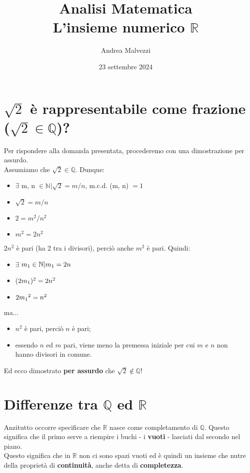 \documentclass[12pt]{article}
\title{\textbf{Analisi Matematica\\L'insieme numerico $\mathbb{R}$}}
\date{23 settembre 2024}
\author{Andrea Malvezzi}
\begin{document}
\maketitle
\pagebreak
\section{$\sqrt{2}$ è rappresentabile come frazione\\($\sqrt{2} \in \mathbb{Q}$)?}
Per rispondere alla domanda presentata, procederemo con una dimostrazione per assurdo.\\
Assumiamo che $\sqrt{2} \in \mathbb{Q}$. Dunque:
\begin{itemize}
    \item $\exists$ m, n $\in \mathbb{N} | \sqrt{2} = m/n$, m.c.d. (m, n) $= 1$
    \item $\sqrt{2} = m/n$
    \item $2 = m^2/n^2$
    \item $m^2 = 2n^2$ 
\end{itemize}
$2n^2$ è pari (ha 2 tra i divisori), perciò anche $m^2$ è pari. Quindi:
\begin{itemize}
    \item $\exists$ $m\textsubscript{1} \in \mathbb{N} | m\textsubscript{1} = 2n$
    \item ($2m\textsubscript{1})^2 = 2n^2$
    \item $2m\textsubscript{1}^2 = n^2$  
\end{itemize}
ma...
\begin{itemize}
    \item $n^2$ è pari, perciò $n$ è pari;
    \item essendo $n$ ed $m$ pari, viene meno la premessa iniziale per cui $m$ e $n$ non hanno divisori in comune.
\end{itemize}
Ed ecco dimostrato \textbf{per assurdo} che $\sqrt{2} \notin \mathbb{Q}$!
\section{Differenze tra $\mathbb{Q}$ ed $\mathbb{R}$}
Anzitutto occorre specificare che $\mathbb{R}$ nasce come completamento di $\mathbb{Q}$. Questo significa che il primo serve a riempire i buchi - i \textbf{vuoti} - lasciati dal secondo nel piano.\\
Questo significa che in $\mathbb{R}$ non ci sono spazi vuoti ed è quindi un insieme che nutre della proprietà di \textbf{continuità}, anche detta di \textbf{completezza}.
\end{document}
